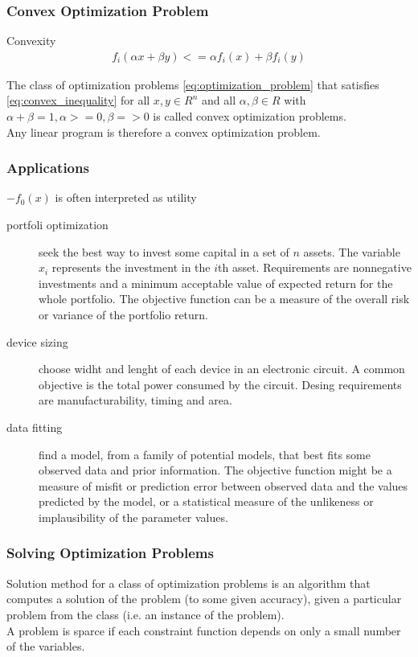 \documentclass{beamer}
\begin{document}

\begin{frame}
\frametitle{Convex Optimization Problem}
\begin{block}{Convexity}
\begin{align}
\label{eq:convex_inequality}
f_{i}(\alpha x + \beta y) <= \alpha f_{i}(x) + \beta f_{i}(y)
\end{align}
\end{block}
The class of optimization problems \ref{eq:optimization_problem} that satisfies \ref{eq:convex_inequality} for all $x,y \in R^{n}$ and all $\alpha, \beta \in R$ with $\alpha + \beta = 1, \alpha >= 0, \beta => 0$ is called convex optimization problems. \\
Any linear program is therefore a convex optimization problem.
\end{frame}


\begin{frame}
\frametitle{Applications}
$-f_{0}(x)$ is often interpreted as utility
\begin{description}
\item [portfoli optimization] seek the best way to invest some capital in a set of $n$ assets. The variable $x_{i}$ represents the investment in the $i$th asset. Requirements are nonnegative investments and a minimum acceptable value of expected return for the whole portfolio. The objective function can be a measure of the overall risk or variance of the portfolio return.
\item [device sizing] choose widht and lenght of each device in an electronic circuit. A common objective is the total power consumed by the circuit. Desing requirements are manufacturability, timing and area.
\item [data fitting] find a model, from a family of potential models, that best fits some observed data and prior information. The objective function might be a measure of misfit or prediction error between observed data and the values predicted by the model, or a statistical measure of the unlikeness or implausibility of the parameter values.
\end{description}
\end{frame}


\begin{frame}
\frametitle{Solving Optimization Problems}
Solution method for a class of optimization problems is an algorithm that computes a solution of the problem (to some given accuracy), given a particular problem from the class (i.e. an instance of the problem). \\
A problem is sparce if each constraint function depends on only a small number of the variables.
\end{frame}
\end{document}
